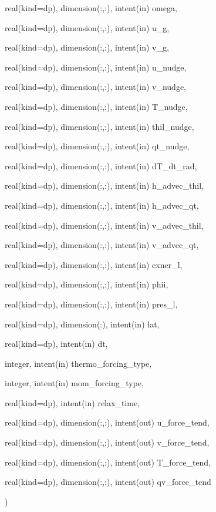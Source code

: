 {\begin{DoxyParamCaption}
\item[{real(kind=dp), dimension(\+:,\+:), intent(in)}]{omega, }
\item[{real(kind=dp), dimension(\+:,\+:), intent(in)}]{u\+\_\+g, }
\item[{real(kind=dp), dimension(\+:,\+:), intent(in)}]{v\+\_\+g, }
\item[{real(kind=dp), dimension(\+:,\+:), intent(in)}]{u\+\_\+nudge, }
\item[{real(kind=dp), dimension(\+:,\+:), intent(in)}]{v\+\_\+nudge, }
\item[{real(kind=dp), dimension(\+:,\+:), intent(in)}]{T\+\_\+nudge, }
\item[{real(kind=dp), dimension(\+:,\+:), intent(in)}]{thil\+\_\+nudge, }
\item[{real(kind=dp), dimension(\+:,\+:), intent(in)}]{qt\+\_\+nudge, }
\item[{real(kind=dp), dimension(\+:,\+:), intent(in)}]{d\+T\+\_\+dt\+\_\+rad, }
\item[{real(kind=dp), dimension(\+:,\+:), intent(in)}]{h\+\_\+advec\+\_\+thil, }
\item[{real(kind=dp), dimension(\+:,\+:), intent(in)}]{h\+\_\+advec\+\_\+qt, }
\item[{real(kind=dp), dimension(\+:,\+:), intent(in)}]{v\+\_\+advec\+\_\+thil, }
\item[{real(kind=dp), dimension(\+:,\+:), intent(in)}]{v\+\_\+advec\+\_\+qt, }
\item[{real(kind=dp), dimension(\+:,\+:), intent(in)}]{exner\+\_\+l, }
\item[{real(kind=dp), dimension(\+:,\+:), intent(in)}]{phii, }
\item[{real(kind=dp), dimension(\+:,\+:), intent(in)}]{pres\+\_\+l, }
\item[{real(kind=dp), dimension(\+:), intent(in)}]{lat, }
\item[{real(kind=dp), intent(in)}]{dt, }
\item[{integer, intent(in)}]{thermo\+\_\+forcing\+\_\+type, }
\item[{integer, intent(in)}]{mom\+\_\+forcing\+\_\+type, }
\item[{real(kind=dp), intent(in)}]{relax\+\_\+time, }
\item[{real(kind=dp), dimension(\+:,\+:), intent(out)}]{u\+\_\+force\+\_\+tend, }
\item[{real(kind=dp), dimension(\+:,\+:), intent(out)}]{v\+\_\+force\+\_\+tend, }
\item[{real(kind=dp), dimension(\+:,\+:), intent(out)}]{T\+\_\+force\+\_\+tend, }
\item[{real(kind=dp), dimension(\+:,\+:), intent(out)}]{qv\+\_\+force\+\_\+tend}
\end{DoxyParamCaption}
)}\hypertarget{group__forcing_ga9f9e7db891365f55c3ce79e70a8fe580}{}\label{group__forcing_ga9f9e7db891365f55c3ce79e70a8fe580}

